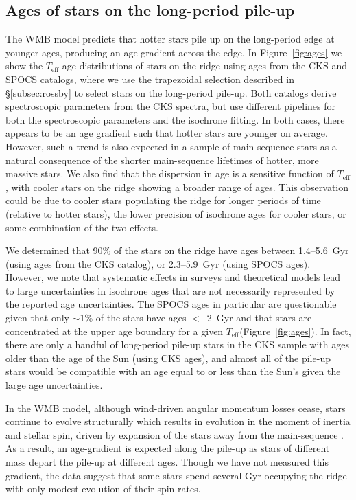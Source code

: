 \documentclass[linenumbers,tighten,trackchanges,twocolumn]{aastex631}
\newcommand{\teff}{\ensuremath{T_{\mathrm{eff}}}\xspace}
\begin{document}
\subsection{Ages of stars on the long-period pile-up}
\label{subsec:ages}
The WMB model predicts that hotter stars pile up on the long-period edge at younger ages, producing an age gradient across the edge. In Figure~\ref{fig:ages} we show the \teff-age distributions of stars on the ridge using ages from the CKS and SPOCS \citep{Brewer2018} catalogs, where we use the trapezoidal selection described in \S\ref{subsec:rossby} to select stars on the long-period pile-up. Both catalogs derive spectroscopic parameters from the CKS spectra, but use different pipelines for both the spectroscopic parameters and the isochrone fitting. In both cases, there appears to be an age gradient such that hotter stars are younger on average. However, such a trend is also expected in a sample of main-sequence stars as a natural consequence of the shorter main-sequence lifetimes of hotter, more massive stars. We also find that the dispersion in age is a sensitive function of \teff, with cooler stars on the ridge showing a broader range of ages. This observation could be due to cooler stars populating the ridge for longer periods of time (relative to hotter stars), the lower precision of isochrone ages for cooler stars, or some combination of the two effects.

We determined that 90\% of the stars on the ridge have ages between 1.4--5.6~Gyr (using ages from the CKS catalog), or 2.3--5.9~Gyr (using SPOCS ages). However, we note that systematic effects in surveys and theoretical models lead to large uncertainties in isochrone ages that are not necessarily represented by the reported age uncertainties. The SPOCS ages in particular are questionable given that only $\sim$1\% of the stars have ages $<$~2~Gyr and that stars are concentrated at the upper age boundary for a given \teff (Figure~\ref{fig:ages}). In fact, there are only a handful of long-period pile-up stars in the CKS sample with ages older than the age of the Sun (using CKS ages), and almost all of the pile-up stars would be compatible with an age equal to or less than the Sun's given the large age uncertainties. 

In the WMB model, although wind-driven angular momentum losses cease, stars continue to evolve structurally which results in evolution in the moment of inertia and stellar spin, driven by expansion of the stars away from the main-sequence \citep{vanSaders2019}. As a result, an age-gradient is expected along the pile-up as stars of different mass depart the pile-up at different ages. Though we have not measured this gradient, the data suggest that some stars spend several Gyr occupying the ridge with only modest evolution of their spin rates.
\end{document}
